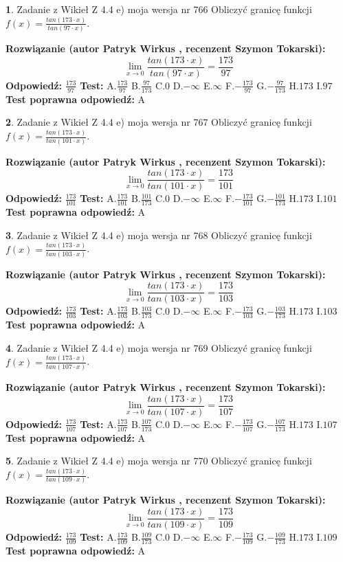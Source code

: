 \documentclass[12pt, a4paper]{article}
\theoremstyle{definition} %
\newtheorem{zad}{}
\newcommand{\zadStart}[1]{\begin{zad}#1\newline}
\newcommand{\zadStop}{\end{zad}}
\newcommand{\rozwStart}[2]{\noindent \textbf{Rozwiązanie (autor #1 , recenzent #2): }\newline}
\newcommand{\rozwStop}{\newline}
\newcommand{\odpStart}{\noindent \textbf{Odpowiedź:}\newline}
\newcommand{\odpStop}{\newline}
\newcommand{\testStart}{\noindent \textbf{Test:}\newline}
\newcommand{\testStop}{\newline}
\newcommand{\kluczStart}{\noindent \textbf{Test poprawna odpowiedź:}\newline}
\newcommand{\kluczStop}{\newline}
\begin{document}
\zadStart{Zadanie z Wikieł Z 4.4 e) moja wersja nr 766}
Obliczyć granicę funkcji $f(x)=\frac{tan(173\cdot x)}{tan(97\cdot x)}$.
\zadStop
\rozwStart{Patryk Wirkus}{Szymon Tokarski}
$$\lim\limits_{x\to 0}\frac{tan(173\cdot x)}{tan(97\cdot x)}=
\frac{173}{97}$$
\rozwStop
\odpStart
$\frac{173}{97}$
\odpStop
\testStart
A.$\frac{173}{97}$
B.$\frac{97}{173}$
C.$0$
D.$-\infty$
E.$\infty$
F.$-\frac{173}{97}$
G.$-\frac{97}{173}$
H.$173$
I.$97$
\testStop
\kluczStart
A
\kluczStop



\zadStart{Zadanie z Wikieł Z 4.4 e) moja wersja nr 767}
Obliczyć granicę funkcji $f(x)=\frac{tan(173\cdot x)}{tan(101\cdot x)}$.
\zadStop
\rozwStart{Patryk Wirkus}{Szymon Tokarski}
$$\lim\limits_{x\to 0}\frac{tan(173\cdot x)}{tan(101\cdot x)}=
\frac{173}{101}$$
\rozwStop
\odpStart
$\frac{173}{101}$
\odpStop
\testStart
A.$\frac{173}{101}$
B.$\frac{101}{173}$
C.$0$
D.$-\infty$
E.$\infty$
F.$-\frac{173}{101}$
G.$-\frac{101}{173}$
H.$173$
I.$101$
\testStop
\kluczStart
A
\kluczStop



\zadStart{Zadanie z Wikieł Z 4.4 e) moja wersja nr 768}
Obliczyć granicę funkcji $f(x)=\frac{tan(173\cdot x)}{tan(103\cdot x)}$.
\zadStop
\rozwStart{Patryk Wirkus}{Szymon Tokarski}
$$\lim\limits_{x\to 0}\frac{tan(173\cdot x)}{tan(103\cdot x)}=
\frac{173}{103}$$
\rozwStop
\odpStart
$\frac{173}{103}$
\odpStop
\testStart
A.$\frac{173}{103}$
B.$\frac{103}{173}$
C.$0$
D.$-\infty$
E.$\infty$
F.$-\frac{173}{103}$
G.$-\frac{103}{173}$
H.$173$
I.$103$
\testStop
\kluczStart
A
\kluczStop



\zadStart{Zadanie z Wikieł Z 4.4 e) moja wersja nr 769}
Obliczyć granicę funkcji $f(x)=\frac{tan(173\cdot x)}{tan(107\cdot x)}$.
\zadStop
\rozwStart{Patryk Wirkus}{Szymon Tokarski}
$$\lim\limits_{x\to 0}\frac{tan(173\cdot x)}{tan(107\cdot x)}=
\frac{173}{107}$$
\rozwStop
\odpStart
$\frac{173}{107}$
\odpStop
\testStart
A.$\frac{173}{107}$
B.$\frac{107}{173}$
C.$0$
D.$-\infty$
E.$\infty$
F.$-\frac{173}{107}$
G.$-\frac{107}{173}$
H.$173$
I.$107$
\testStop
\kluczStart
A
\kluczStop



\zadStart{Zadanie z Wikieł Z 4.4 e) moja wersja nr 770}
Obliczyć granicę funkcji $f(x)=\frac{tan(173\cdot x)}{tan(109\cdot x)}$.
\zadStop
\rozwStart{Patryk Wirkus}{Szymon Tokarski}
$$\lim\limits_{x\to 0}\frac{tan(173\cdot x)}{tan(109\cdot x)}=
\frac{173}{109}$$
\rozwStop
\odpStart
$\frac{173}{109}$
\odpStop
\testStart
A.$\frac{173}{109}$
B.$\frac{109}{173}$
C.$0$
D.$-\infty$
E.$\infty$
F.$-\frac{173}{109}$
G.$-\frac{109}{173}$
H.$173$
I.$109$
\testStop
\kluczStart
A
\kluczStop
\end{document}
